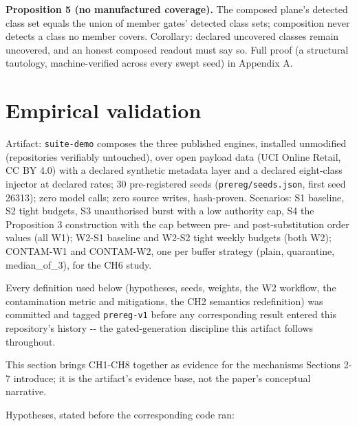 \documentclass[11pt,a4paper]{article}
\theoremstyle{definition}
\begin{document}
\noindent\textbf{Proposition 5 (no manufactured coverage).} The composed plane's detected class set equals the union of member gates' detected class sets; composition never detects a class no member covers. Corollary: declared uncovered classes remain uncovered, and an honest composed readout must say so. Full proof (a structural tautology, machine-verified across every swept seed) in Appendix A.

\section{Empirical validation}

Artifact: \texttt{suite-demo} composes the three published engines, installed unmodified (repositories verifiably untouched), over open payload data (UCI Online Retail, CC BY 4.0) with a declared synthetic metadata layer and a declared eight-class injector at declared rates; 30 pre-registered seeds (\texttt{prereg/seeds.json}, first seed 26313); zero model calls; zero source writes, hash-proven. Scenarios: S1 baseline, S2 tight budgets, S3 unauthorised burst with a low authority cap, S4 the Proposition 3 construction with the cap between pre- and post-substitution order values (all W1); W2-S1 baseline and W2-S2 tight weekly budgets (both W2); CONTAM-W1 and CONTAM-W2, one per buffer strategy (plain, quarantine, median\_of\_3), for the CH6 study.

Every definition used below (hypotheses, seeds, weights, the W2 workflow, the contamination metric and mitigations, the CH2 semantics redefinition) was committed and tagged \texttt{prereg-v1} before any corresponding result entered this repository's history -{}- the gated-generation discipline this artifact follows throughout.

This section brings CH1-CH8 together as evidence for the mechanisms Sections 2-7 introduce; it is the artifact's evidence base, not the paper's conceptual narrative.

Hypotheses, stated before the corresponding code ran:
\end{document}
